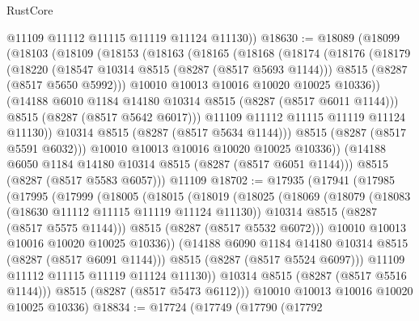 \begin{lexlean}{RustCore}
\begin{coremodule}
        @11109
        @11112
        @11115
        @11119
        @11124
        @11130))
@18630 := @18089
    (@18099
      (@18103
        (@18109
          (@18153
            (@18163
              (@18165
                (@18168
                  (@18174
                    (@18176
                      (@18179
                        (@18220
                          (@18547 @10314 @8515 (@8287 (@8517 @5693 @1144)))
                          @8515
                          (@8287 (@8517 @5650 @5992)))
                        @10010
                        @10013
                        @10016
                        @10020
                        @10025
                        @10336))
                    (@14188 @6010 @1184 @14180 @10314 @8515 (@8287 (@8517 @6011 @1144)))
                    @8515
                    (@8287 (@8517 @5642 @6017)))
                  @11109
                  @11112
                  @11115
                  @11119
                  @11124
                  @11130))
              @10314
              @8515
              (@8287 (@8517 @5634 @1144)))
            @8515
            (@8287 (@8517 @5591 @6032)))
          @10010
          @10013
          @10016
          @10020
          @10025
          @10336))
      (@14188 @6050 @1184 @14180 @10314 @8515 (@8287 (@8517 @6051 @1144)))
      @8515
      (@8287 (@8517 @5583 @6057)))
    @11109
@18702 := @17935
    (@17941
      (@17985
        (@17995
          (@17999
            (@18005
              (@18015
                (@18019
                  (@18025
                    (@18069
                      (@18079
                        (@18083 (@18630 @11112 @11115 @11119 @11124 @11130))
                        @10314
                        @8515
                        (@8287 (@8517 @5575 @1144)))
                      @8515
                      (@8287 (@8517 @5532 @6072)))
                    @10010
                    @10013
                    @10016
                    @10020
                    @10025
                    @10336))
                (@14188 @6090 @1184 @14180 @10314 @8515 (@8287 (@8517 @6091 @1144)))
                @8515
                (@8287 (@8517 @5524 @6097)))
              @11109
              @11112
              @11115
              @11119
              @11124
              @11130))
          @10314
          @8515
          (@8287 (@8517 @5516 @1144)))
        @8515
        (@8287 (@8517 @5473 @6112)))
      @10010
      @10013
      @10016
      @10020
      @10025
      @10336)
@18834 := @17724
    (@17749
      (@17790
        (@17792

\end{coremodule}
\end{lexlean}
